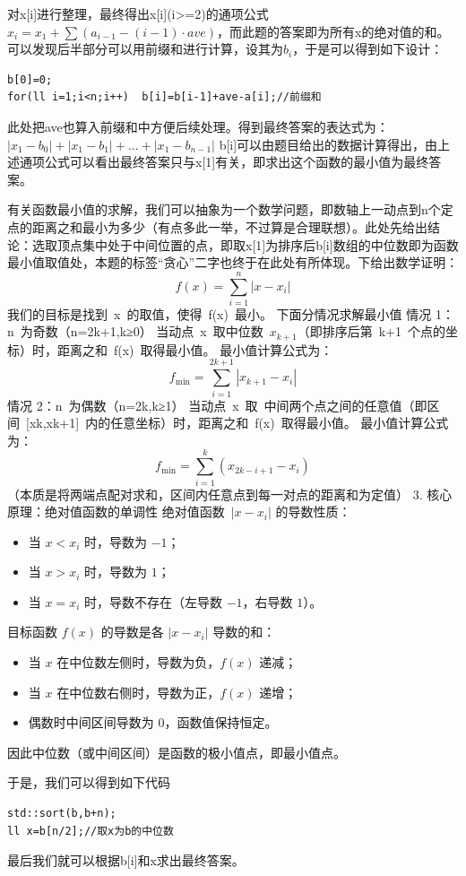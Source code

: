 \documentclass[supercite]{Experimental_Report}
\theoremstyle{definition}
\begin{document}
对x[i]进行整理，最终得出x[i](i>=2)的通项公式$x_i = x_1 + \sum (a_{i-1} - (i-1) \cdot ave)$，而此题的答案即为所有x的绝对值的和。可以发现后半部分可以用前缀和进行计算，设其为$b_i$，于是可以得到如下设计：
\begin{lstlisting}
b[0]=0;
for(ll i=1;i<n;i++)  b[i]=b[i-1]+ave-a[i];//前缀和
\end{lstlisting}
此处把ave也算入前缀和中方便后续处理。得到最终答案的表达式为：$|x_1 - b_0| + |x_1 - b_1| + \dots + |x_1 - b_{n-1}|$
b[i]可以由题目给出的数据计算得出，由上述通项公式可以看出最终答案只与x[1]有关，即求出这个函数的最小值为最终答案。

有关函数最小值的求解，我们可以抽象为一个数学问题，即数轴上一动点到n个定点的距离之和最小为多少（有点多此一举，不过算是合理联想）。此处先给出结论：选取顶点集中处于中间位置的点，即取x[1]为排序后b[i]数组的中位数即为函数最小值取值处，本题的标签“贪心”二字也终于在此处有所体现。下给出数学证明：
\[
f(x) = \sum_{i=1}^n |x - x_i|
\]我们的目标是找到 x 的取值，使得 f(x) 最小。
下面分情况求解最小值
情况 1：n 为奇数（n=2k+1,k≥0）
当动点 x 取中位数 $x_{k+1}$（即排序后第 k+1 个点的坐标）时，距离之和 f(x) 取得最小值。
最小值计算公式为：
\[
f_{\text{min}} = \sum_{i=1}^{2k+1} |x_{k+1} - x_i|
\]
情况 2：n 为偶数（n=2k,k≥1）
当动点 x 取 中间两个点之间的任意值（即区间 [xk​,xk+1​] 内的任意坐标）时，距离之和 f(x) 取得最小值。
最小值计算公式为：
\[
f_{\text{min}} = \sum_{i=1}^k (x_{2k - i + 1} - x_i)
\]（本质是将两端点配对求和，区间内任意点到每一对点的距离和为定值）
3. 核心原理：绝对值函数的单调性
绝对值函数 $|x−x_i|$ 的导数性质：
\begin{itemize}
    \item 当 $x < x_i$ 时，导数为 $-1$；
    \item 当 $x > x_i$ 时，导数为 $1$；
    \item 当 $x = x_i$ 时，导数不存在（左导数 $-1$，右导数 $1$）。
\end{itemize}

目标函数 $f(x)$ 的导数是各 $|x - x_i|$ 导数的和：
\begin{itemize}
    \item 当 $x$ 在中位数左侧时，导数为负，$f(x)$ 递减；
    \item 当 $x$ 在中位数右侧时，导数为正，$f(x)$ 递增；
    \item 偶数时中间区间导数为 $0$，函数值保持恒定。
\end{itemize}
因此中位数（或中间区间）是函数的极小值点，即最小值点。

于是，我们可以得到如下代码
\begin{lstlisting}
std::sort(b,b+n);
ll x=b[n/2];//取x为b的中位数
\end{lstlisting}
最后我们就可以根据b[i]和x求出最终答案。
\end{document}
